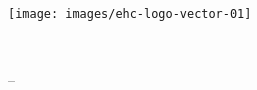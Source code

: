 \vspace{-0.5cm}
\texttt{[image: images/ehc-logo-vector-01]}

\vspace{8.5cm}
\begin{minipage}{\textwidth}
	\sffamily

	\vspace{2mm}
	{\YUGE \raggedleft\bookletunittitle\\}

	\vspace{1mm}
	{\huge \raggedleft\coursetitle { }-- \formattedunittitle\\}

	\vspace{2mm}
	{\small \raggedleft\bookletsubtitle\\}
\end{minipage}